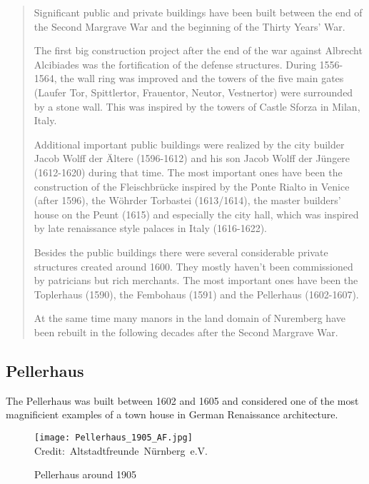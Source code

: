 \blockquote{
	Significant public and private buildings have been built between the end of the Second Margrave War and the beginning of the Thirty Years' War.
	
	The first big construction project after the end of the war against Albrecht Alcibiades was the fortification of the defense structures. During 1556-1564, the wall ring was improved and the towers of the five main gates (Laufer Tor, Spittlertor, Frauentor, Neutor, Vestnertor) were surrounded by a stone wall. This was inspired by the towers of Castle Sforza in Milan, Italy.
	
	Additional important public buildings were realized by the city builder Jacob Wolff der Ältere (1596-1612) and his son Jacob Wolff der Jüngere (1612-1620) during that time. The most important ones have been the construction of the Fleischbrücke inspired by the Ponte Rialto in Venice (after 1596), the Wöhrder Torbastei (1613/1614), the master builders' house on the Peunt (1615) and especially the city hall, which was inspired by late renaissance style palaces in Italy (1616-1622).
	
	Besides the public buildings there were several considerable private structures created around 1600. They mostly haven't been commissioned by patricians but rich merchants. The most important ones have been the Toplerhaus (1590), the Fembohaus (1591) and the Pellerhaus (1602-1607).
	
	At the same time many manors in the land domain of Nuremberg have been rebuilt in the following decades after the Second Margrave War.	
}


\pagebreak

\subsection{Pellerhaus}

The Pellerhaus was built between 1602 and 1605 and considered one of the most magnificient examples of a town house in German Renaissance architecture.

\begin{wrapfigure}{r}{0.5\textwidth}
	
	\centering
	
	\texttt{[image: Pellerhaus\_1905\_AF.jpg]}
	\hbox{\scriptsize Credit: Altstadtfreunde Nürnberg e.V.}
	\caption{Pellerhaus around 1905}
	\label{fig:pellerhaus_1905}
	\vspace{-10pt}
	
\end{wrapfigure}

